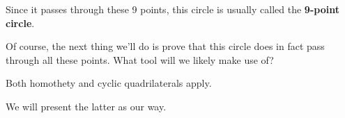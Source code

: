 Since it passes through these 9 points, this circle is usually called the \textbf{9-point circle}.

Of course, the next thing we'll do is prove that this circle does in fact pass through all these points. What tool will we likely make use of?

















Both homothety and cyclic quadrilaterals apply.

We will present the latter as our way.



